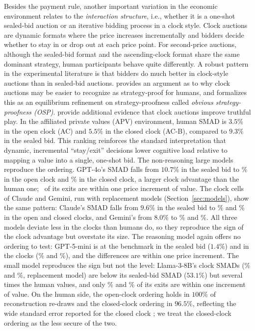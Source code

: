 \documentclass[acmsmall,screen,review]{acmart}
\newcommand{\rev}[1]{{\color{blue}#1}}
\newcommand{\rev}[1]{#1}
\begin{document}
Besides the payment rule, another important variation in the economic environment relates to the \emph{interaction structure}, i.e., whether it is a one-shot sealed-bid auction or an iterative bidding process in a clock style. Clock auctions are dynamic formats where the price increases incrementally and bidders decide whether to stay in or drop out at each price point. For second-price auctions, although the sealed-bid format and the ascending-clock format share the same dominant strategy, human participants behave quite differently. A robust pattern in the experimental literature is that bidders do much better in clock-style auctions than in sealed-bid auctions. \citet{li2017obviously} provides an argument as to why clock auctions may be easier to recognize as strategy-proof for humans, and formalizes this as an equilibrium refinement on strategy-proofness called {\em obvious strategy-proofness (OSP)}. \citet{breitmoser2022obviousness} provide additional evidence that clock auctions improve truthful play. In the affiliated private values (APV) environment, human SMAD is $3.5\%$ in the open clock (AC) and \rev{$5.5\%$} in the closed clock (AC-B), compared to $9.3\%$ in the sealed bid. This ranking reinforces the standard interpretation that dynamic, incremental ``stay/exit'' decisions lower cognitive load relative to mapping a value into a single, one-shot bid. \rev{The non-reasoning large models reproduce the ordering. GPT-4o's SMAD falls from $10.7\%$ in the sealed bid to \SmadACGpt\% in the open clock and \SmadACBGpt\% in the closed clock, a larger clock advantage than the human one; \TickBothGpt\ of its exits are within one price increment of value. The clock cells of Claude and Gemini, run with replacement models (Section~\ref{sec:models}), show the same pattern: Claude's SMAD falls from $9.6\%$ in the sealed bid to \SmadACClaude\% and \SmadACBClaude\% in the open and closed clocks, and Gemini's from $8.0\%$ to \SmadACGemini\% and \SmadACBGemini\%. All three models deviate less in the clocks than humans do, so they reproduce the sign of the clock advantage but overstate its size. The reasoning model again offers no ordering to test: GPT-5-mini is at the benchmark in the sealed bid ($1.4\%$) and in the clocks (\SmadACMini\% and \SmadACBMini\%), and the differences are within one price increment. The small model reproduces the sign but not the level: Llama-3-8B's clock SMADs (\SmadACLlama\% and \SmadACBLlama\%, replacement model) are below its sealed-bid SMAD ($53.1\%$) but several times the human values, and only \TickACLlama\% and \TickACBLlama\% of its exits are within one increment of value.} On the human side, the open-clock ordering holds in $100\%$ of reconstruction re-draws and the closed-clock ordering in \rev{$96.5\%$}, reflecting the wide standard error reported for the closed clock \citep{breitmoser2022obviousness}; we treat the closed-clock ordering as the less secure of the two.
\end{document}
